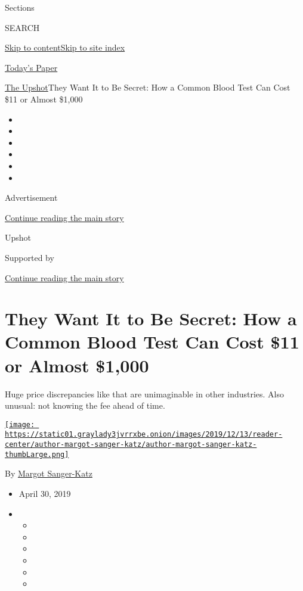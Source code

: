 Sections

SEARCH

\protect\hyperlink{site-content}{Skip to
content}\protect\hyperlink{site-index}{Skip to site index}

\href{https://myaccount.nytimes3xbfgragh.onion/auth/login?response_type=cookie\&client_id=vi}{}

\href{https://www.nytimes3xbfgragh.onion/section/todayspaper}{Today's
Paper}

\href{/section/upshot}{The Upshot}\textbar{}They Want It to Be Secret:
How a Common Blood Test Can Cost \$11 or Almost \$1,000

\begin{itemize}
\item
\item
\item
\item
\item
\item
\end{itemize}

Advertisement

\protect\hyperlink{after-top}{Continue reading the main story}

Upshot

Supported by

\protect\hyperlink{after-sponsor}{Continue reading the main story}

\hypertarget{they-want-it-to-be-secret-how-a-common-blood-test-can-cost-11-or-almost-1000}{%
\section{They Want It to Be Secret: How a Common Blood Test Can Cost
\$11 or Almost
\$1,000}\label{they-want-it-to-be-secret-how-a-common-blood-test-can-cost-11-or-almost-1000}}

Huge price discrepancies like that are unimaginable in other industries.
Also unusual: not knowing the fee ahead of time.

\href{https://www.nytimes3xbfgragh.onion/by/margot-sanger-katz}{\texttt{[image: https://static01.graylady3jvrrxbe.onion/images/2019/12/13/reader-center/author-margot-sanger-katz/author-margot-sanger-katz-thumbLarge.png]}}

By
\href{https://www.nytimes3xbfgragh.onion/by/margot-sanger-katz}{Margot
Sanger-Katz}

\begin{itemize}
\item
  April 30, 2019
\item
  \begin{itemize}
  \item
  \item
  \item
  \item
  \item
  \item
  \end{itemize}
\end{itemize}

